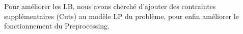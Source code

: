 \documentclass[twoside,fleqn]{EPURapport}
\begin{document}
Pour améliorer les LB, nous avons cherché d'ajouter des contraintes supplémentaires (Cuts) au modèle LP du problème, pour enfin améliorer le fonctionnement du Preprocessing.

\begin{comment}
\subsubsection{Preprocessing sur les variables booléennes de décision $X^t_{i,j}$}
Le tableau \ref{tab_pre_x} est le résultat d'un autre test sur Preprocessing. Dans ce test, au lieu de passer toutes les variables au Preprocessing, on passe seulement les variables de décision $X^t_{i,j}$, qui représente l'ordonnancement trouvé, au Preprocessing car on pense que ces variables sont les plus influentes. Par rapport au premier test, ce test ne change que les 3 dernières colonnes sur la proportion des variables fixées, le résultat sur la qualité de LB et UB reste le même.


\begin{table}[h]
    \centering
    \begin{tabular}{|c|c|c|c|}
    	\hline
    	Sc(N/M)	&  $\%Fix_{min}$ & $\%Fix_{avg}$ & $\%Fix_{max}$\\ \hline
    	Sc1(8/2) &0.00\% & 13.84\% & 100.00\%\\ \hline
Sc2(11/3)&0.00\% & 10.15\% & 42.42\%\\ \hline
Sc3(15/4)&0.00\% & 0.56\%  &7.36\%\\ \hline
Sc4(18/5)&0.00\% & 3.07\%  &59.07\%\\ \hline
Sc5(21/5)&0.00\% & 0.00\%  &0.00\%\\ \hline
Sc6(24/6)&0.00\% & 3.45\%  &59.07\%\\ \hline
    \end{tabular}
    \label{tab_pre_x}
    \caption{Résultat de test du Preprocessing sur les variables de décision $X^t_{i,j}$}
\end{table}
\bigskip

\subsection{Conclusion sur le Preprocessing}
En comparant le résultat détaillé des deux tests effectués, on a constaté que la plupart des variables fixées sont les variables de décision $X^t_{i,j}$. Cependant, pour certaines instances, si on passe seulement les $X^t_{i,j}$ au Preprocessing aucune variable peut être fixée mais si on passe toutes variables booléennes au Preprocessing il y aura des variables fixées. Ça veut dire il y a quand même des variables booléennes qui ne sont pas $X^t_{i,j}$ mais qui ont des effets sur le Preprocessing. En conclusion on pense que c'est mieux de faire le Preprocessin pour toutes les variables booléennes.

\end{comment}
\end{document}
